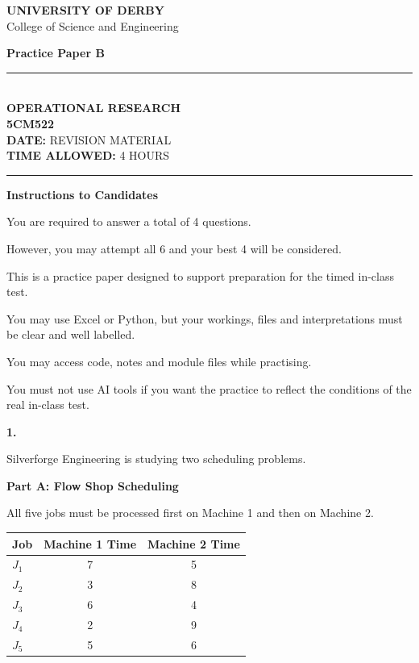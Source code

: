 \documentclass[11pt,a4paper]{article}
\newcommand{\universityname}{UNIVERSITY OF DERBY}
\newcommand{\college}{College of Science and Engineering}
\newcommand{\examtitle}{Practice Paper B}
\newcommand{\moduletitle}{OPERATIONAL RESEARCH}
\newcommand{\modulecode}{5CM522}
\newcommand{\examdate}{REVISION MATERIAL}
\newcommand{\timeallowed}{4 HOURS}
\begin{document}
\begin{center}
{\large \textbf{\universityname}}\\
{\college}
\end{center}

\vspace{0.5em}

\begin{center}
{\Large \textbf{\examtitle}}\\[0.5em]
\rule{\textwidth}{0.4pt}\\[0.6em]
{\large \textbf{\moduletitle}}\\
{\large \textbf{\modulecode}}\\[0.4em]
\textbf{DATE:} \examdate\\
\textbf{TIME ALLOWED:} \timeallowed\\[0.3em]
\rule{\textwidth}{0.4pt}
\end{center}

\textbf{Instructions to Candidates}

You are required to answer a total of 4 questions.

However, you may attempt all 6 and your best 4 will be considered.

This is a practice paper designed to support preparation for the timed in-class test.

You may use Excel or Python, but your workings, files and interpretations must be clear and well labelled.

You may access code, notes and module files while practising.

You must not use AI tools if you want the practice to reflect the conditions of the real in-class test.

\newpage

\textbf{1.}

Silverforge Engineering is studying two scheduling problems.

\textbf{Part A: Flow Shop Scheduling}

All five jobs must be processed first on Machine 1 and then on Machine 2.

\begin{center}
\begin{tabular}{lcc}
\toprule
Job & Machine 1 Time & Machine 2 Time \\
\midrule
$J_1$ & 7 & 5 \\
$J_2$ & 3 & 8 \\
$J_3$ & 6 & 4 \\
$J_4$ & 2 & 9 \\
$J_5$ & 5 & 6 \\
\bottomrule
\end{tabular}
\end{center}
\end{document}
